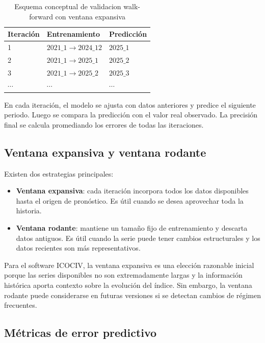 \begin{table}[H]
\centering
\caption{Esquema conceptual de validacion walk-forward con ventana expansiva}
\label{tab:walkforward_legacy}
\begin{tabular}{lll}
\toprule
\textbf{Iteración} & \textbf{Entrenamiento} & \textbf{Predicción} \\
\midrule
1 & \(2021\_1 \rightarrow 2024\_12\) & \(2025\_1\) \\
2 & \(2021\_1 \rightarrow 2025\_1\) & \(2025\_2\) \\
3 & \(2021\_1 \rightarrow 2025\_2\) & \(2025\_3\) \\
\(\cdots\) & \(\cdots\) & \(\cdots\) \\
\bottomrule
\end{tabular}
\end{table}

En cada iteración, el modelo se ajusta con datos anteriores y predice el siguiente periodo. Luego se compara la predicción con el valor real observado. La precisión final se calcula promediando los errores de todas las iteraciones.

\subsection{Ventana expansiva y ventana rodante}

Existen dos estrategias principales:

\begin{itemize}
    \item \textbf{Ventana expansiva}: cada iteración incorpora todos los datos disponibles hasta el origen de pronóstico. Es útil cuando se desea aprovechar toda la historia.
    \item \textbf{Ventana rodante}: mantiene un tamaño fijo de entrenamiento y descarta datos antiguos. Es útil cuando la serie puede tener cambios estructurales y los datos recientes son más representativos.
\end{itemize}

Para el software ICOCIV, la ventana expansiva es una elección razonable inicial porque las series disponibles no son extremadamente largas y la información histórica aporta contexto sobre la evolución del índice. Sin embargo, la ventana rodante puede considerarse en futuras versiones si se detectan cambios de régimen frecuentes.

\subsection{Métricas de error predictivo}

